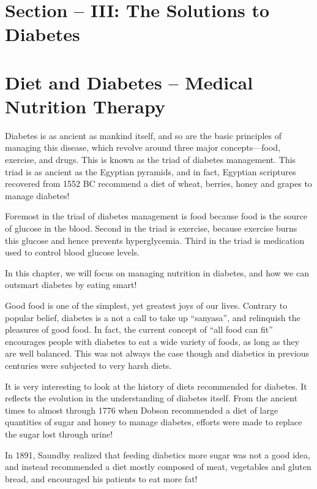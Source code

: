 
\chapter{Section – III: The Solutions to Diabetes}

\chapter{Diet and Diabetes – Medical Nutrition Therapy}

Diabetes is as ancient as mankind itself, and so are the basic principles of managing this disease, which revolve around three major concepts—food, exercise, and drugs. This is known as the triad of diabetes management. This triad is as ancient as the Egyptian pyramids, and in fact, Egyptian scriptures recovered from 1552 BC recommend a diet of wheat, berries, honey and grapes to manage diabetes!

Foremost in the triad of diabetes management is food because food is the source of glucose in the blood. Second in the triad is exercise, because exercise burns this glucose and hence prevents hyperglycemia. Third in the triad is medication used to control blood glucose levels.

In this chapter, we will focus on managing nutrition in diabetes, and how we can outsmart diabetes by eating smart!

Good food is one of the simplest, yet greatest joys of our lives. Contrary to popular belief, diabetes is a not a call to take up “sanyasa”, and relinquish the pleasures of good food. In fact, the current concept of “all food can fit” encourages people with diabetes to eat a wide variety of foods, as long as they are well balanced. This was not always the case though and diabetics in previous centuries were subjected to very harsh diets.


It is very interesting to look at the history of diets recommended for diabetes. It reflects the evolution in the understanding of diabetes itself. From the ancient times to almost through 1776 when Dobson recommended a diet of large quantities of sugar and honey to manage diabetes, efforts were made to replace the sugar lost through urine!

In 1891, Saundby realized that feeding diabetics more sugar was not a good idea, and instead recommended a diet mostly composed of meat, vegetables and gluten bread, and encouraged his patients to eat more fat!

